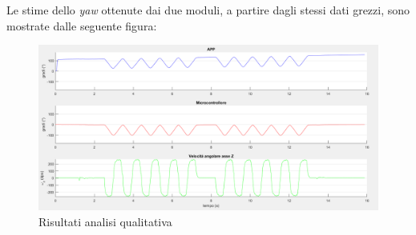 Le stime dello \textit{yaw} ottenute dai due moduli, a partire dagli stessi dati grezzi, sono mostrate dalle seguente figura:
\begin{figure}
	\includegraphics[width=\textwidth]{analisi/analisiQualitativa.png}
	\caption{Risultati analisi qualitativa}
	\label{fig:analisiQualitativa}
\end{figure}
\newpage


